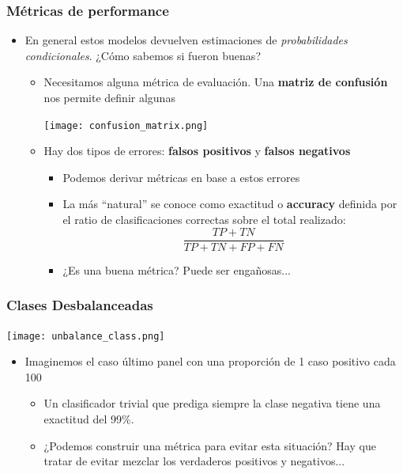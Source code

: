 \documentclass[leqno, 10pt, envcountsect]{beamer}
\numberwithin{equation}{section}
\theoremstyle{definition}
\theoremstyle{example}
\numberwithin{figure}{section}
\numberwithin{table}{section}
\let\olditem\item
\renewcommand{\item}{%
\olditem\vspace{1pt}}
\begin{document}
\begin{frame}[fragile=singleslide]
  \frametitle{Métricas de performance}
  \begin{itemize}
    \item En general estos modelos devuelven estimaciones de
      \textit{probabilidades condicionales}. ¿Cómo sabemos si fueron buenas?
    \begin{itemize}
      \item Necesitamos alguna métrica de evaluación. Una \textbf{matriz de
        confusión} nos permite definir algunas
        \begin{center}
          \texttt{[image: confusion\_matrix.png]}
        \end{center}
        \item Hay dos tipos de errores: \textbf{falsos positivos}
          y \textbf{falsos negativos}
          \begin{itemize}
            \item Podemos derivar métricas en base a estos errores
            \item La más \enquote{natural} se conoce como exactitud o
              \textbf{accuracy} definida por el ratio de clasificaciones
              correctas sobre el total realizado:
              \begin{equation*}
                \frac{TP + TN}{TP + TN + FP + FN}
              \end{equation*}
            \item ¿Es una buena métrica? Puede ser engañosas...
          \end{itemize}
    \end{itemize}
  \end{itemize}
\end{frame}
\begin{frame}[fragile=singleslide]
  \frametitle{Clases Desbalanceadas}
  \begin{center}
    \texttt{[image: unbalance\_class.png]}
  \end{center}
  \begin{itemize}
    \item Imaginemos el caso último panel con una proporción de 1 caso
      positivo cada 100
      \begin{itemize}
        \item Un clasificador trivial que prediga siempre la clase negativa
          tiene una exactitud del 99\%.
        \item ¿Podemos construir una métrica para evitar esta situación? Hay
          que tratar de evitar mezclar los verdaderos positivos y negativos...
      \end{itemize}
  \end{itemize}
\end{frame}
\end{document}
